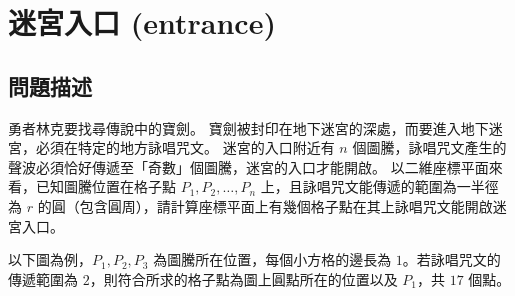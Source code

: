 \section{迷宮入口 (entrance)}

\subsection{問題描述}

勇者林克要找尋傳說中的寶劍。
寶劍被封印在地下迷宮的深處，而要進入地下迷宮，必須在特定的地方詠唱咒文。
迷宮的入口附近有 \begin{math}n\end{math}
個圖騰，詠唱咒文產生的聲波必須恰好傳遞至「奇數」個圖騰，迷宮的入口才能開啟。
以二維座標平面來看，已知圖騰位置在格子點
\begin{math}P_1, P_2, \ldots, P_n\end{math}
上，且詠唱咒文能傳遞的範圍為一半徑為 \begin{math}r\end{math}
的圓（包含圓周），請計算座標平面上有幾個格子點在其上詠唱咒文能開啟迷宮入口。

以下圖為例，\begin{math}P_1, P_2, P_3\end{math}
為圖騰所在位置，每個小方格的邊長為
\begin{math}1\end{math}。若詠唱咒文的傳遞範圍為
\begin{math}2\end{math}，則符合所求的格子點為圖上圓點所在的位置以及
\begin{math}P_1\end{math}，共 \begin{math}17\end{math} 個點。

